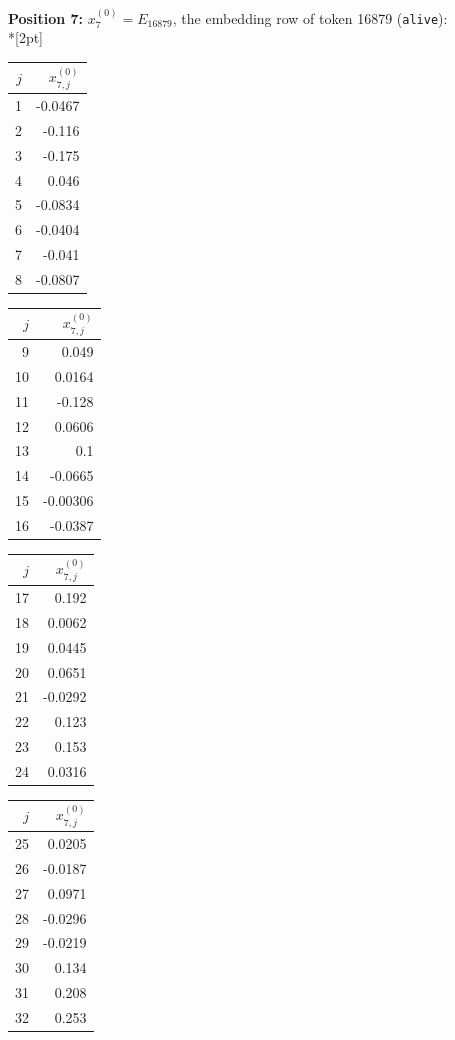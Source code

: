 \noindent \textbf{Position 7:} $x^{(0)}_{7} = E_{16879}$, the embedding row of token 16879 (\texttt{\textvisiblespace{}alive}):\\*[2pt]
{\tablefont \begin{tabular}[t]{r|r}
$j$ & $x^{(0)}_{7,j}$ \\\hline
1 & -0.0467 \\
2 & -0.116 \\
3 & -0.175 \\
4 & 0.046 \\
5 & -0.0834 \\
6 & -0.0404 \\
7 & -0.041 \\
8 & -0.0807
\end{tabular}\kern4pt
\begin{tabular}[t]{r|r}
$j$ & $x^{(0)}_{7,j}$ \\\hline
9 & 0.049 \\
10 & 0.0164 \\
11 & -0.128 \\
12 & 0.0606 \\
13 & 0.1 \\
14 & -0.0665 \\
15 & -0.00306 \\
16 & -0.0387
\end{tabular}\kern4pt
\begin{tabular}[t]{r|r}
$j$ & $x^{(0)}_{7,j}$ \\\hline
17 & 0.192 \\
18 & 0.0062 \\
19 & 0.0445 \\
20 & 0.0651 \\
21 & -0.0292 \\
22 & 0.123 \\
23 & 0.153 \\
24 & 0.0316
\end{tabular}\kern4pt
\begin{tabular}[t]{r|r}
$j$ & $x^{(0)}_{7,j}$ \\\hline
25 & 0.0205 \\
26 & -0.0187 \\
27 & 0.0971 \\
28 & -0.0296 \\
29 & -0.0219 \\
30 & 0.134 \\
31 & 0.208 \\
32 & 0.253
\end{tabular}\kern4pt
\begin{tabular}[t]{r|r}

\end{tabular}}
